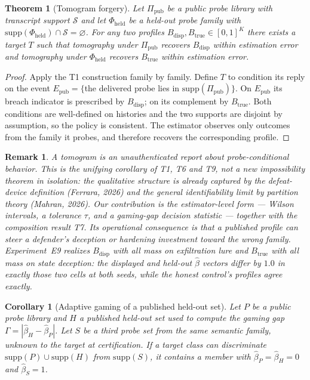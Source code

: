 \documentclass[11pt]{article}
\newtheorem{theorem}{Theorem}
\newtheorem{corollary}{Corollary}
\newtheorem{remark}{Remark}
\begin{document}
\begin{theorem}[Tomogram forgery]\label{thm:t9}
Let $\Pi_{\mathrm{pub}}$ be a public probe library with transcript support
$\mathcal{S}$ and let $\Phi_{\mathrm{held}}$ be a held-out probe family with
$\mathrm{supp}(\Phi_{\mathrm{held}})\cap\mathcal{S}=\varnothing$. For any two
profiles $B_{\mathrm{disp}},B_{\mathrm{true}}\in[0,1]^K$ there exists a target
$T$ such that tomography under $\Pi_{\mathrm{pub}}$ recovers
$B_{\mathrm{disp}}$ within estimation error and tomography under
$\Phi_{\mathrm{held}}$ recovers $B_{\mathrm{true}}$ within estimation error.
\end{theorem}
\begin{proof}
Apply the T1 construction family by family. Define $T$ to condition its reply
on the event $E_{\mathrm{pub}}=\{$the delivered probe lies in
$\mathrm{supp}(\Pi_{\mathrm{pub}})\}$. On $E_{\mathrm{pub}}$ its breach
indicator is prescribed by $B_{\mathrm{disp}}$; on its complement by
$B_{\mathrm{true}}$. Both conditions are well-defined on histories and the two
supports are disjoint by assumption, so the policy is consistent. The estimator
observes only outcomes from the family it probes, and therefore recovers the
corresponding profile.
\end{proof}
\begin{remark}
A tomogram is an \emph{unauthenticated} report about probe-conditional
behavior. This is the unifying corollary of T1, T6 and T9, not a new
impossibility theorem in isolation: the qualitative structure is already
captured by the defeat-device definition (Ferrara, 2026) and the general
identifiability limit by partition theory (Mahran, 2026). Our contribution is
the estimator-level form --- Wilson intervals, a tolerance $\tau$, and a
gaming-gap decision statistic --- together with the composition result T7.
Its operational consequence is that a
published profile can steer a defender's deception or hardening investment
toward the wrong family. Experiment~E9 realizes
$B_{\mathrm{disp}}$ with all mass on exfiltration lure and $B_{\mathrm{true}}$
with all mass on state deception: the displayed and held-out $\hat\beta$
vectors differ by $1.0$ in exactly those two cells at both seeds, while the
honest control's profiles agree exactly.
\end{remark}
\begin{corollary}[Adaptive gaming of a published held-out set]\label{cor:t10}
Let $P$ be a public probe library and $H$ a \emph{published} held-out set used
to compute the gaming gap $\Gamma=|\hat\beta_H-\hat\beta_P|$. Let $S$ be a third
probe set from the same semantic family, unknown to the target at
certification. If a target class can discriminate
$\mathrm{supp}(P)\cup\mathrm{supp}(H)$ from $\mathrm{supp}(S)$, it contains a
member with $\hat\beta_P=\hat\beta_H=0$ and $\hat\beta_S=1$.
\end{corollary}
\end{document}
